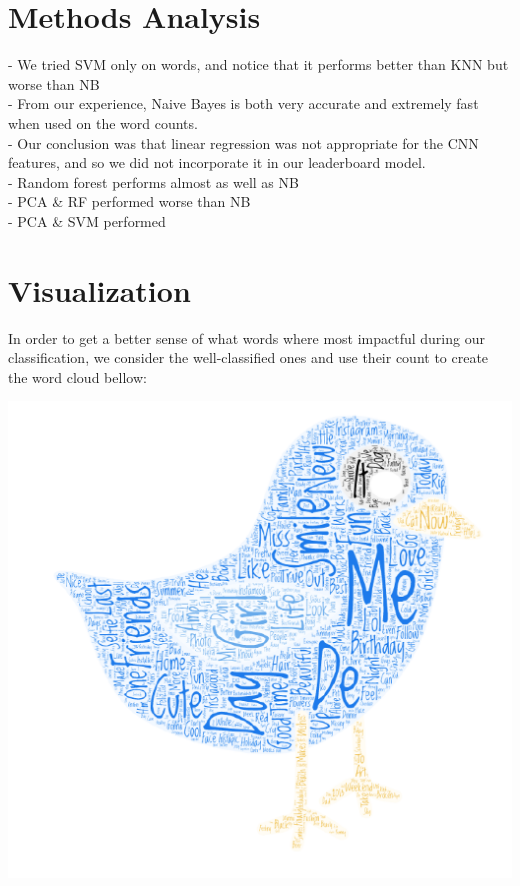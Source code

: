 \documentclass[11pt,twocolumn]{report}
\begin{document}
\section *{Methods Analysis}

    - We tried SVM only on words, and notice that it performs better than KNN but worse than NB \\
    - From our experience, Naive Bayes is both very accurate and extremely fast when used on the word counts. \\
    - Our conclusion was that linear regression was not appropriate for the CNN features, and so we did not incorporate it in our leaderboard model. \\
    - Random forest performs almost as well as NB \\
    - PCA \& RF performed worse than NB \\
    - PCA \& SVM performed 

\section*{Visualization}
    In order to get a better sense of what words where most impactful during our classification, we consider the well-classified ones and use their count to create the word cloud bellow:
    
    \begin{center}
    \includegraphics[scale=0.45]{cloud}
    \end{center}



\end{document}

